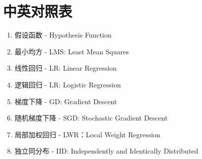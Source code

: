\section{中英对照表}
\begin{enumerate}
	\item 假设函数 - Hypothesis Function
	\item 最小均方 - LMS: Least Mean Squares
	\item 线性回归 - LR: Linear Regression
	\item 逻辑回归 - LR: Logistic Regression
	\item 梯度下降 - GD: Gradient Descent
	\item 随机梯度下降 - SGD: Stochastic Gradient Descent
	\item 局部加权回归 - LWR：Local Weight Regression
	\item 独立同分布 - IID: Independently and Identically Distributed
\end{enumerate}